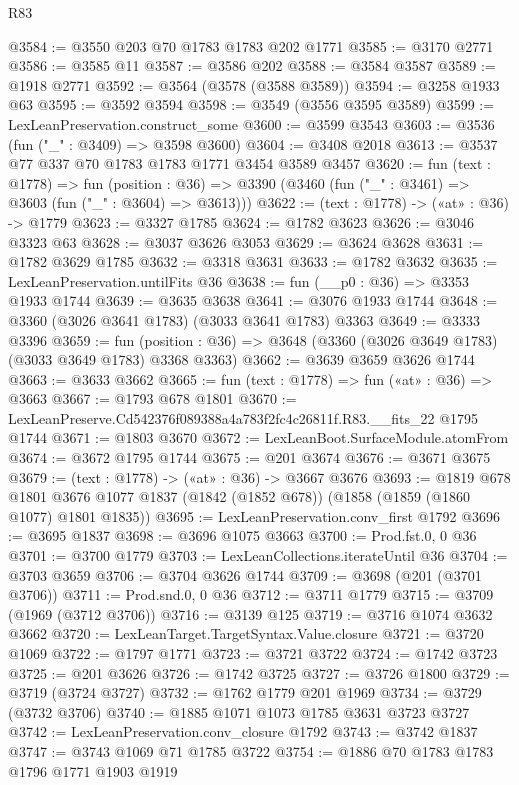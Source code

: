 \begin{lexlean}{R83}
\begin{coremodule}
@3584 := @3550 @203 @70 @1783 @1783 @202 @1771
@3585 := @3170 @2771
@3586 := @3585 @11
@3587 := @3586 @202
@3588 := @3584 @3587
@3589 := @1918 @2771
@3592 := @3564 (@3578 (@3588 @3589))
@3594 := @3258 @1933 @63
@3595 := @3592 @3594
@3598 := @3549 (@3556 @3595 @3589)
@3599 := LexLeanPreservation.construct_some
@3600 := @3599 @3543
@3603 := @3536 (fun ("_" : @3409) => @3598 @3600)
@3604 := @3408 @2018
@3613 := @3537 @77 @337 @70 @1783 @1783 @1771 @3454 @3589 @3457
@3620 := fun (text : @1778) =>
  fun (position : @36) => @3390 (@3460 (fun ("_" : @3461) => @3603 (fun ("_" : @3604) => @3613)))
@3622 := (text : @1778) -> («at» : @36) -> @1779
@3623 := @3327 @1785
@3624 := @1782 @3623
@3626 := @3046 @3323 @63
@3628 := @3037 @3626 @3053
@3629 := @3624 @3628
@3631 := @1782 @3629 @1785
@3632 := @3318 @3631
@3633 := @1782 @3632
@3635 := LexLeanPreservation.untilFits @36
@3638 := fun (__p0 : @36) => @3353 @1933 @1744
@3639 := @3635 @3638
@3641 := @3076 @1933 @1744
@3648 := @3360 (@3026 @3641 @1783) (@3033 @3641 @1783) @3363
@3649 := @3333 @3396
@3659 := fun (position : @36) => @3648 (@3360 (@3026 @3649 @1783) (@3033 @3649 @1783) @3368 @3363)
@3662 := @3639 @3659 @3626 @1744
@3663 := @3633 @3662
@3665 := fun (text : @1778) => fun («at» : @36) => @3663
@3667 := @1793 @678 @1801
@3670 := LexLeanPreserve.Cd542376f089388a4a783f2fc4c26811f.R83.__fits_22 @1795 @1744
@3671 := @1803 @3670
@3672 := LexLeanBoot.SurfaceModule.atomFrom
@3674 := @3672 @1795 @1744
@3675 := @201 @3674
@3676 := @3671 @3675
@3679 := (text : @1778) -> («at» : @36) -> @3667 @3676
@3693 := @1819
    @678
    @1801
    @3676
    @1077
    @1837
    (@1842 (@1852 @678))
    (@1858 (@1859 (@1860 @1077) @1801 @1835))
@3695 := LexLeanPreservation.conv_first @1792
@3696 := @3695 @1837
@3698 := @3696 @1075 @3663
@3700 := Prod.fst.{0, 0} @36
@3701 := @3700 @1779
@3703 := LexLeanCollections.iterateUntil @36
@3704 := @3703 @3659
@3706 := @3704 @3626 @1744
@3709 := @3698 (@201 (@3701 @3706))
@3711 := Prod.snd.{0, 0} @36
@3712 := @3711 @1779
@3715 := @3709 (@1969 (@3712 @3706))
@3716 := @3139 @125
@3719 := @3716 @1074 @3632 @3662
@3720 := LexLeanTarget.TargetSyntax.Value.closure
@3721 := @3720 @1069
@3722 := @1797 @1771
@3723 := @3721 @3722
@3724 := @1742 @3723
@3725 := @201 @3626
@3726 := @1742 @3725
@3727 := @3726 @1800
@3729 := @3719 (@3724 @3727)
@3732 := @1762 @1779 @201 @1969
@3734 := @3729 (@3732 @3706)
@3740 := @1885 @1071 @1073 @1785 @3631 @3723 @3727
@3742 := LexLeanPreservation.conv_closure @1792
@3743 := @3742 @1837
@3747 := @3743 @1069 @71 @1785 @3722
@3754 := @1886 @70 @1783 @1783 @1796 @1771 @1903 @1919

\end{coremodule}
\end{lexlean}

